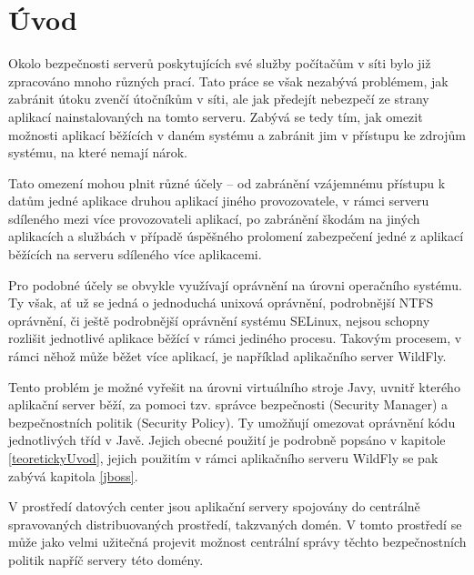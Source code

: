 
\chapter{Úvod} \label{uplnyUvod}

Okolo bezpečnosti serverů poskytujících své služby počítačům v síti bylo již zpracováno mnoho různých prací.
Tato práce se však nezabývá problémem, jak zabránit útoku zvenčí útočníkům v síti, ale jak předejít nebezpečí ze strany aplikací nainstalovaných na tomto serveru.
Zabývá se tedy tím, jak omezit možnosti aplikací běžících v daném systému a zabránit jim v přístupu ke zdrojům systému, na které nemají nárok.

Tato omezení mohou plnit různé účely -- od zabránění vzájemnému přístupu k datům jedné aplikace druhou aplikací jiného provozovatele,
v rámci serveru sdíleného mezi více provozovateli aplikací, po zabránění škodám na jiných aplikacích a službách v případě úspěšného prolomení
zabezpečení jedné z aplikací běžících na serveru sdíleného více aplikacemi.

Pro podobné účely se obvykle využívají oprávnění na úrovni operačního systému.
Ty však, ať už se jedná o jednoduchá unixová oprávnění, podrobnější NTFS oprávnění, či ještě podrobnější oprávnění systému SELinux,
nejsou schopny rozlišit jednotlivé aplikace běžící v rámci jediného procesu.
Takovým procesem, v rámci něhož může běžet více aplikací, je například aplikačního server WildFly.

Tento problém je možné vyřešit na úrovni virtuálního stroje Javy, uvnitř kterého aplikační server běží, za pomoci tzv. správce bezpečnosti (Security Manager)
a bezpečnostních politik (Security Policy). Ty umožňují omezovat oprávnění kódu jednotlivých tříd v Javě.
Jejich obecné použití je podrobně popsáno v kapitole \ref{teoretickyUvod}, jejich použitím v rámci aplikačního serveru WildFly se pak zabývá kapitola \ref{jboss}.

V prostředí datových center jsou aplikační servery spojovány do centrálně spravovaných distribuovaných prostředí, takzvaných domén.
V tomto prostředí se může jako velmi užitečná projevit možnost centrální správy těchto bezpečnostních politik napříč servery této domény.

